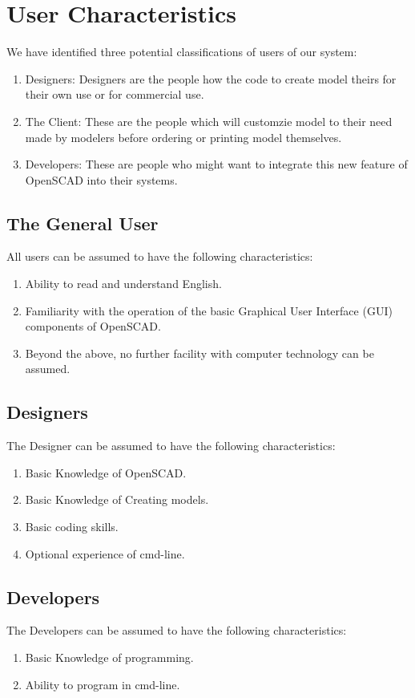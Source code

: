 \section{User Characteristics}

We have identified three potential classifications of users of our system:

\begin{enumerate}
    \item Designers: Designers are the people how the code to create model theirs for their own use or for commercial use.
    \item The Client: These are the people which will customzie model to their need made by modelers before ordering or printing model themselves.
    \item Developers: These are people who might want to integrate this new feature of OpenSCAD into their systems.
   
\end{enumerate}

\subsection{The General User}

All users can be assumed to have the following characteristics:

\begin{enumerate}
    \item Ability to read and understand English.
    \item Familiarity with the operation of the basic Graphical User Interface (GUI) components of OpenSCAD.
    \item Beyond the above, no further facility with computer technology can be assumed.
\end{enumerate}

\subsection{Designers}
The Designer can be assumed to have the following characteristics:
\begin{enumerate}
    \item Basic Knowledge of OpenSCAD.
    \item Basic Knowledge of Creating models.
    \item Basic coding skills.
    \item Optional experience of cmd-line.
\end{enumerate}

\subsection{Developers}
The Developers can be assumed to have the following characteristics:
\begin{enumerate}
    \item Basic Knowledge of programming.
    \item Ability to program in cmd-line.
\end{enumerate}
